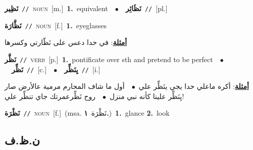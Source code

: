 \documentclass[10pt,a4paper,twoside]{article} %
\begin{document}
\begin{multicols}{2}
{\setlength\topsep{0pt}\textbf{\foreignlanguage{arabic}{نَظِير}}\ {\color{gray}\texttt{//}\color{black}}\ \textsc{noun}\ [m.]\ \textbf{1.}~equivalent\ \ $\bullet$\ \ \setlength\topsep{0pt}\textbf{\foreignlanguage{arabic}{نَظَائِر}}\ {\color{gray}\texttt{//}\color{black}}\ [pl.]\ } \vspace{2mm}

{\setlength\topsep{0pt}\textbf{\foreignlanguage{arabic}{نَظَّارَة}}\ {\color{gray}\texttt{//}\color{black}}\ \textsc{noun}\ [f.]\ \textbf{1.}~eyeglasses\  \begin{flushright}\color{gray}\foreignlanguage{arabic}{\textbf{\underline{\foreignlanguage{arabic}{أمثلة}}}: في حدا دعس على نَظّارتي وكسرها}\end{flushright}\color{black}} \vspace{2mm}

{\setlength\topsep{0pt}\textbf{\foreignlanguage{arabic}{نَظَّر}}\ {\color{gray}\texttt{//}\color{black}}\ \textsc{verb}\ [p.]\ \textbf{1.}~pontificate over sth and pretend to be perfect\ \ $\bullet$\ \ \setlength\topsep{0pt}\textbf{\foreignlanguage{arabic}{نَظِّر}}\ {\color{gray}\texttt{//}\color{black}}\ [c.]\ \ $\bullet$\ \ \setlength\topsep{0pt}\textbf{\foreignlanguage{arabic}{يِنَظِّر}}\ {\color{gray}\texttt{//}\color{black}}\ [i.]\  \begin{flushright}\color{gray}\foreignlanguage{arabic}{\textbf{\underline{\foreignlanguage{arabic}{أمثلة}}}: أكره ماعلي حدا يجي ينَظِّر علي\ $\bullet$\ \  أول ما شاف المحارم مرمية عالأرض صار يِنَظِّر علينا كأنه نبي منزل\ $\bullet$\ \  روح نَظِّرعمرتك جاي تنظِّر علي!}\end{flushright}\color{black}} \vspace{2mm}

{\setlength\topsep{0pt}\textbf{\foreignlanguage{arabic}{نَظْرَة}}\ {\color{gray}\texttt{//}\color{black}}\ \textsc{noun}\ [f.]\ \color{gray}(msa. \foreignlanguage{arabic}{نَظْرَة}~\foreignlanguage{arabic}{\textbf{١.}})\color{black}\ \textbf{1.}~glance  \textbf{2.}~look\ } \vspace{2mm}

\vspace{-3mm}
\subsection*{\color{blue}\foreignlanguage{arabic}{ن.ظ.ف}\color{blue}{}} 


\end{multicols}
\end{document}
